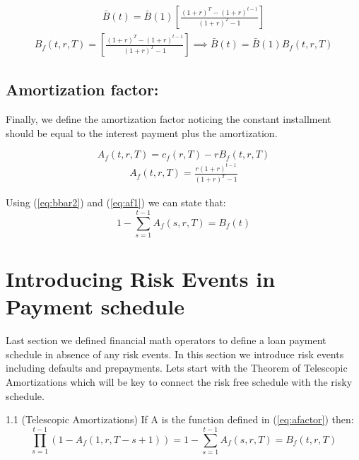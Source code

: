 \begin{align}
    \bar{B}(t)=\bar{B}(1)\left[ \frac{(1+r)^T-(1+r)^{t-1}}{(1+r)^T-1} \right]
\end{align}
\begin{align}
    \boxed{B_f(t,r,T)=\left[ \frac{(1+r)^T-(1+r)^{t-1}}{(1+r)^T-1} \right]} \implies \bar{B}(t)=\bar{B}(1)B_f(t,r,T)
\end{align}
\subsection{Amortization factor:}
Finally, we define the amortization factor noticing the constant installment should be equal to the interest payment plus the amortization.

\begin{equation}
    A_f(t,r,T) = c_f(r,T)-rB_f(t,r,T) \label{eq:af1}
\end{equation}
\begin{align}
    \boxed{A_f(t,r,T)=\frac{r(1+r)^{t-1}}{(1+r)^T-1}} \label{eq:afactor}
\end{align}
\begin{corollary}{1}
Using (\ref{eq:bbar2}) and (\ref{eq:af1}) we can state that:
\[
1-\sum_{s=1}^{t-1} A_f(s,r,T)=B_f(t)
\]
\end{corollary} 

\section{Introducing Risk Events in Payment schedule}
Last section we defined financial math operators to define a loan payment schedule in absence of any risk events. In this section we introduce risk events including defaults and prepayments. Lets start with the Theorem of Telescopic Amortizations which will be key to connect the risk free schedule with the risky schedule.
\begin{theorem}{1.1 (Telescopic Amortizations)}{} \label{teo:1}
If A is the function defined in (\ref{eq:afactor}) then:
\[
\prod^{t-1}_{s=1}(1-A_f(1,r,T-s+1))=1-\sum^{t-1}_{s=1}A_f(s,r,T) =B_f(t,r,T)
\]
\end{theorem}

